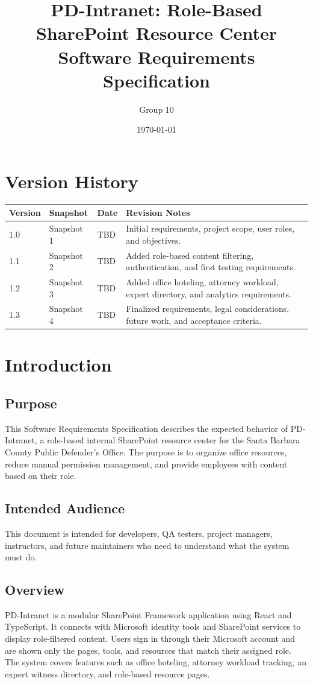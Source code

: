 \documentclass[12pt]{article}
\title{PD-Intranet: Role-Based SharePoint Resource Center \\ \large Software Requirements Specification}
\author{Group 10}
\date{\today}
\begin{document}
\maketitle
\tableofcontents
\newpage

\section{Version History}
\begin{longtable}{|p{1in}|p{1.3in}|p{1.4in}|p{2.6in}|}
\hline
\textbf{Version} & \textbf{Snapshot} & \textbf{Date} & \textbf{Revision Notes} \\ \hline
1.0 & Snapshot 1 & TBD & Initial requirements, project scope, user roles, and objectives. \\ \hline
1.1 & Snapshot 2 & TBD & Added role-based content filtering, authentication, and first testing requirements. \\ \hline
1.2 & Snapshot 3 & TBD & Added office hoteling, attorney workload, expert directory, and analytics requirements. \\ \hline
1.3 & Snapshot 4 & TBD & Finalized requirements, legal considerations, future work, and acceptance criteria. \\ \hline
\end{longtable}

\section{Introduction}

\subsection{Purpose}
This Software Requirements Specification describes the expected behavior of PD-Intranet, a role-based internal SharePoint resource center for the Santa Barbara County Public Defender's Office. The purpose is to organize office resources, reduce manual permission management, and provide employees with content based on their role.

\subsection{Intended Audience}
This document is intended for developers, QA testers, project managers, instructors, and future maintainers who need to understand what the system must do.

\subsection{Overview}
PD-Intranet is a modular SharePoint Framework application using React and TypeScript. It connects with Microsoft identity tools and SharePoint services to display role-filtered content. Users sign in through their Microsoft account and are shown only the pages, tools, and resources that match their assigned role. The system covers features such as office hoteling, attorney workload tracking, an expert witness directory, and role-based resource pages.
\end{document}
